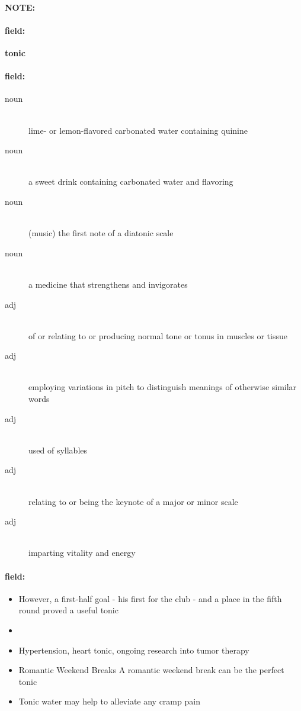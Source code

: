 \documentclass[12pt]{article}
\newenvironment{note}{\paragraph{NOTE:}}{}
\newenvironment{field}{\paragraph{field:}}{}
\begin{document}
\begin{note}
\begin{field}
\textbf{\large tonic}
\end{field}


\begin{field}
\begin{description}
\item[noun] \hfill \\ 
lime- or lemon-flavored carbonated water containing quinine

\item[noun] \hfill \\ 
a sweet drink containing carbonated water and flavoring

\item[noun] \hfill \\ 
(music) the first note of a diatonic scale

\item[noun] \hfill \\ 
a medicine that strengthens and invigorates

\item[adj] \hfill \\ 
of or relating to or producing normal tone or tonus in muscles or tissue

\item[adj] \hfill \\ 
employing variations in pitch to distinguish meanings of otherwise similar words

\item[adj] \hfill \\ 
used of syllables

\item[adj] \hfill \\ 
relating to or being the keynote of a major or minor scale

\item[adj] \hfill \\ 
imparting vitality and energy

\end{description}
\end{field}

\begin{field}
\begin{itemize}
\item However, a first-half goal - his first for the club - and a place in the fifth round proved a useful tonic
\item 
\item Hypertension, heart tonic, ongoing research into tumor therapy
\item Romantic Weekend Breaks A romantic weekend break can be the perfect tonic
\item Tonic water may help to alleviate any cramp pain
\end{itemize}
\end{field}
\end{note}
\end{document}
